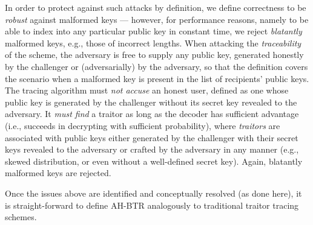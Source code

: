 In order to protect against such attacks by definition,
we define correctness to be \emph{robust} against malformed keys ---
however, for performance reasons, namely to be able to index into any particular public key in constant time,
we reject \emph{blatantly} malformed keys, e.g., those of incorrect lengths.
When attacking the \emph{traceability} of the scheme, the adversary is free to supply any public key, generated honestly by the challenger or (adversarially) by the adversary, so that the definition covers the scenario when a malformed key is present in the list of recipients' public keys.
The tracing algorithm must \emph{not accuse} an honest user, defined as one whose public key is generated by the challenger without its secret key revealed to the adversary.
It \emph{must find} a traitor as long as the decoder has sufficient advantage (i.e., succeeds in decrypting with sufficient probability), where \emph{traitors} are associated with public keys either generated by the challenger with their secret keys revealed to the adversary or crafted by the adversary in any manner (e.g., skewed distribution, or even without a well-defined secret key).
Again, blatantly malformed keys are rejected.

Once the issues above are identified and conceptually resolved (as done here),
it is straight-forward to define AH-BTR analogously to traditional traitor tracing schemes.
